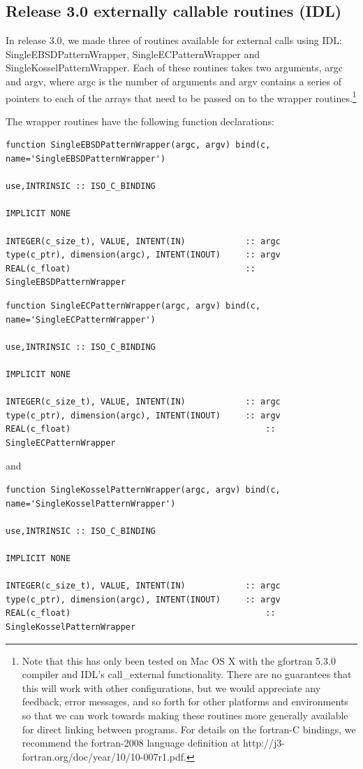 \documentclass[DIV=calc, paper=letter, fontsize=11pt]{scrartcl}	 %
\begin{document}
\subsection{Release 3.0 externally callable routines (IDL)}
In release 3.0, we made three of routines available for external calls using IDL: 
\textsf{SingleEBSDPatternWrapper}, \textsf{SingleECPatternWrapper} and  \textsf{SingleKosselPatternWrapper}. Each of these routines
takes two arguments, \textsf{argc} and \textsf{argv}, where \textsf{argc} is the number of arguments
and \textsf{argv} contains a series of pointers to each of the arrays that need to be passed on to the wrapper routines.\footnote{Note 
that this has only been tested on Mac OS X with the gfortran 5.3.0 compiler and IDL's \textsf{call\_external} functionality.
There are no guarantees that this will work with other configurations, but we would appreciate any feedback, error messages, and
so forth for other platforms and environments so that we can work towards making these routines more generally available for direct linking between programs.
For details on the fortran-C bindings, we recommend the fortran-2008 language definition at http://j3-fortran.org/doc/year/10/10-007r1.pdf.}

The wrapper routines have the following function declarations:
{\small\begin{verbatim}
function SingleEBSDPatternWrapper(argc, argv) bind(c, name='SingleEBSDPatternWrapper') 

use,INTRINSIC :: ISO_C_BINDING

IMPLICIT NONE

INTEGER(c_size_t), VALUE, INTENT(IN)            :: argc 
type(c_ptr), dimension(argc), INTENT(INOUT)     :: argv
REAL(c_float)                                   :: SingleEBSDPatternWrapper
\end{verbatim}}

{\small\begin{verbatim}
function SingleECPatternWrapper(argc, argv) bind(c, name='SingleECPatternWrapper') 
	
use,INTRINSIC :: ISO_C_BINDING

IMPLICIT NONE

INTEGER(c_size_t), VALUE, INTENT(IN)            :: argc 
type(c_ptr), dimension(argc), INTENT(INOUT)     :: argv
REAL(c_float)                                  		:: SingleECPatternWrapper
\end{verbatim}}
and 
{\small\begin{verbatim}
function SingleKosselPatternWrapper(argc, argv) bind(c, name='SingleKosselPatternWrapper') 
	
use,INTRINSIC :: ISO_C_BINDING

IMPLICIT NONE

INTEGER(c_size_t), VALUE, INTENT(IN)            :: argc 
type(c_ptr), dimension(argc), INTENT(INOUT)     :: argv
REAL(c_float)                                  		:: SingleKosselPatternWrapper
\end{verbatim}}
\end{document}
